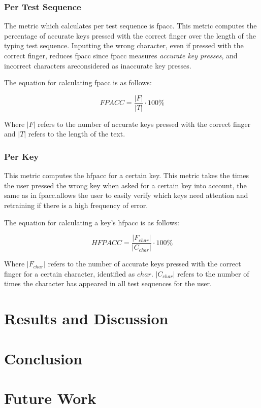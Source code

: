 \documentclass{report}
\begin{document}
\subsection{Per Test Sequence}
The metric which calculates per test sequence is \ac{fpacc}. This metric
computes the percentage of accurate keys pressed with the correct finger over the
length of the typing test sequence. Inputting the wrong character, even if
pressed with the correct finger, reduces \ac{fpacc} since \ac{fpacc} measures
\emph{accurate key presses}, and incorrect characters areconsidered as
inaccurate key presses.

The equation for calculating \ac{fpacc} is as follows:

\begin{equation}
	FP ACC = \frac{|F|}{|T|} \cdot 100\%
\end{equation}

Where $|F|$ refers to the number of accurate keys pressed with the
correct finger and $|T|$ refers to the length of the text.

\subsection{Per Key}
This metric computes the \ac{hfpacc} for a certain key. This metric takes the
times the user pressed the wrong key when asked for a certain key into account,
the same as in \ac{fpacc}.\@This allows the user to easily verify which keys
need attention and retraining if there is a high frequency of error.

The equation for calculating a key's \ac{hfpacc} is as follows:

\begin{equation}
	HFP ACC = \frac{|F_{char}|}{|C_{char}|} \cdot 100\%
\end{equation}

Where $|F_{char}|$ refers to the number of accurate keys pressed with the
correct finger for a certain character, identified as $char$. $|C_{char}|$
refers to the number of times the character has appeared in all test sequences
for the user.

\chapter{Results and Discussion}
\chapter{Conclusion}
\chapter{Future Work}
\end{document}
